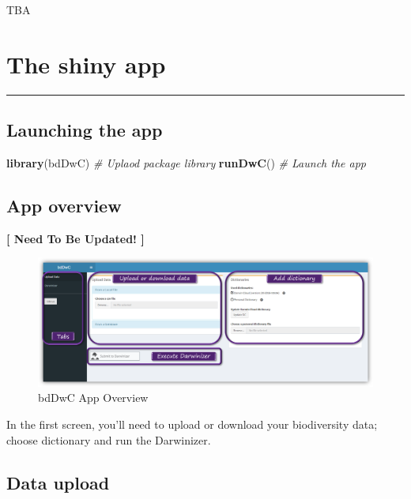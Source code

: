 \documentclass[]{book}
\newenvironment{Shaded}{\begin{snugshade}}{\end{snugshade}}
\newcommand{\KeywordTok}[1]{\textcolor[rgb]{0.13,0.29,0.53}{\textbf{#1}}}
\newcommand{\CommentTok}[1]{\textcolor[rgb]{0.56,0.35,0.01}{\textit{#1}}}
\newcommand{\NormalTok}[1]{#1}
\theoremstyle{definition}
\theoremstyle{definition}
\theoremstyle{definition}
\theoremstyle{remark}
\begin{document}
TBA

\chapter{The shiny app}\label{the-shiny-app}

\begin{center}\rule{0.5\linewidth}{\linethickness}\end{center}

\section{Launching the app}\label{launching-the-app}

\begin{Shaded}
\begin{Highlighting}[]
\KeywordTok{library}\NormalTok{(bdDwC) }\CommentTok{# Uplaod package library}
\KeywordTok{runDwC}\NormalTok{() }\CommentTok{# Launch the app}
\end{Highlighting}
\end{Shaded}

\section{App overview}\label{app-overview}

\textbf{{{[} Need To Be Updated! {]}}}

\begin{figure}
\centering
\includegraphics{img/bdDwC_Getting_started.png}
\caption{bdDwC App Overview}
\end{figure}

In the first screen, you'll need to upload or download your biodiversity
data; choose dictionary and run the Darwinizer.

\section{Data upload}\label{data-upload}
\end{document}
